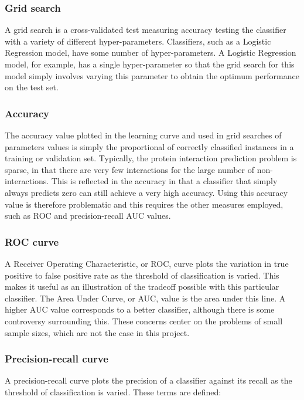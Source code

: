 

\subsubsection*{Grid search}
A grid search is a cross-validated test measuring accuracy testing the classifier with a variety of different hyper-parameters.
Classifiers, such as a Logistic Regression model, have some number of hyper-parameters.
A Logistic Regression model, for example, has a single hyper-parameter so that the grid search for this model simply involves varying this parameter to obtain the optimum performance on the test set.

\subsubsection*{Accuracy}
The accuracy value plotted in the learning curve and used in grid searches of parameters values is simply the proportional of correctly classified instances in a training or validation set.
Typically, the protein interaction prediction problem is sparse, in that there are very few interactions for the large number of non-interactions.
This is reflected in the accuracy in that a classifier that simply always predicts zero can still achieve a very high accuracy.
Using this accuracy value is therefore problematic and this requires the other measures employed, such as ROC and precision-recall AUC values.

\subsubsection*{ROC curve}
A Receiver Operating Characteristic, or ROC, curve plots the variation in true positive to false positive rate as the threshold of classification is varied.
This makes it useful as an illustration of the tradeoff possible with this particular classifier.
The Area Under Curve, or AUC, value is the area under this line.
A higher AUC value corresponds to a better classifier, although there is some controversy surrounding this\autocite{hanczar_small-sample_2010}.
These concerns center on the problems of small sample sizes, which are not the case in this project.

\subsubsection*{Precision-recall curve}
A precision-recall curve plots the precision of a classifier against its recall as the threshold of classification is varied.
These terms are defined:

